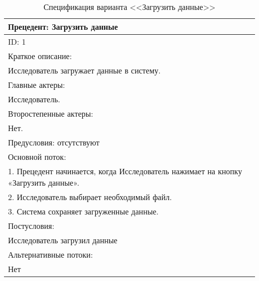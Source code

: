 \begin{table}[h]
    \caption{Спецификация варианта <<Загрузить данные>>}
    \vspace{1em}
    \begin{tabular}{|p{\textwidth}|}
       \hline
        Прецедент: Загрузить данные\\ \hline
        ID: 1\\ \hline
        Краткое описание: \\ Исследователь загружает данные в систему.\\ \hline
        Главные актеры: \\ Исследователь.\\ \hline
        Второстепенные актеры: \\ Нет.\\ \hline
        Предусловия: отсутствуют\\ \hline
        Основной поток:\\
        1. Прецедент начинается, когда Исследователь нажимает на кнопку «Загрузить данные».\\
        2. Исследователь выбирает необходимый файл.\\
        3. Система сохраняет загруженные данные.
        \\ \hline
        Постусловия:\\ Исследователь загрузил данные \\ \hline
        Альтернативные потоки:\\ Нет \\ \hline
    \end{tabular} 
    \label{tab:UploadingData}
\end{table}
\vspace{2em}



